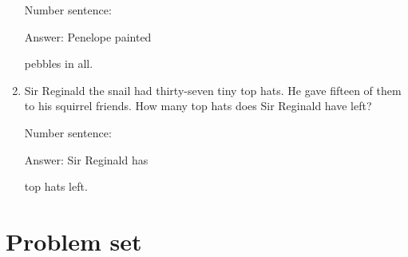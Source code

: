 \documentclass{tufte-book}
\begin{document}
\begin{enumerate}
  Number sentence:
  \dotfill\medskip\par
  Answer: Penelope painted
  \dotfill\medskip\par\mbox{}\dotfill\medskip\par\mbox{}\dotfill\bigskip
  pebbles in all.
\item
  Sir Reginald the snail had thirty-seven tiny top hats. He gave fifteen
  of them to his squirrel friends. How many top hats does Sir Reginald
  have left?\medskip\par
  Number sentence:
  \dotfill\medskip\par
  Answer: Sir Reginald has
  \dotfill\medskip\par\mbox{}\dotfill\medskip\par\mbox{}\dotfill\bigskip
  top hats left.
\end{enumerate}



\clearpage\section{Problem set }
\end{document}
